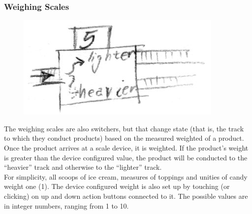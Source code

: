 \documentclass[a4paper]{scrartcl}
\begin{document}
        \subsubsection{Weighing Scales}
            \begin{minipage}[t][8em][t]{\textwidth}
                \begin{figure}
                    \vspace{-20pt}
                    \includegraphics[scale=1]{devices/scale}
                    \vspace{-20pt}
                \end{figure}

                The weighing scales are also switchers, but that change state (that is, the track to which they conduct products) based on the measured weighted of a product. Once the product arrives at a scale device, it is weighted. If the product's weight is greater than the device configured value, the product will be conducted to the ``heavier'' track and otherwise to the ``lighter'' track.
                \\
                For simplicity, all scoops of ice cream, measures of toppings and unities of candy weight one (1). The device configured weight is also set up by touching (or clicking) on up and down action buttons connected to it. The possible values are in integer numbers, ranging from 1 to 10.
            \end{minipage}
            
\end{document}
